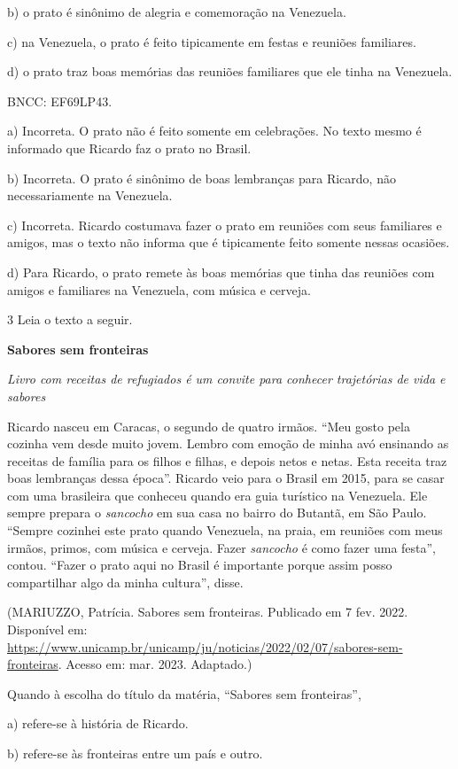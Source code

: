 b) o prato é sinônimo de alegria e comemoração na Venezuela.

c) na Venezuela, o prato é feito tipicamente em festas e reuniões
familiares.

d) o prato traz boas memórias das reuniões familiares que ele tinha na
Venezuela.

BNCC: EF69LP43.

a) Incorreta. O prato não é feito somente em celebrações. No texto mesmo
é informado que Ricardo faz o prato no Brasil.

b) Incorreta. O prato é sinônimo de boas lembranças para Ricardo, não
necessariamente na Venezuela.

c) Incorreta. Ricardo costumava fazer o prato em reuniões com seus
familiares e amigos, mas o texto não informa que é tipicamente feito
somente nessas ocasiões.

d) Para Ricardo, o prato remete às boas memórias que tinha das reuniões
com amigos e familiares na Venezuela, com música e cerveja.

\num{3} Leia o texto a seguir.

\textbf{Sabores sem fronteiras}

\emph{Livro com receitas de refugiados é um convite para conhecer
trajetórias de vida e sabores}

Ricardo nasceu em Caracas, o segundo de quatro irmãos. ``Meu gosto pela
cozinha vem desde muito jovem. Lembro com emoção de minha avó ensinando
as receitas de família para os filhos e filhas, e depois netos e netas.
Esta receita traz boas lembranças dessa época''. Ricardo veio para o
Brasil em 2015, para se casar com uma brasileira que conheceu quando era
guia turístico na Venezuela. Ele sempre prepara o \emph{sancocho} em sua
casa no bairro do Butantã, em São Paulo. ``Sempre cozinhei este prato
quando Venezuela, na praia, em reuniões com meus irmãos, primos, com
música e cerveja. Fazer \emph{sancocho} é como fazer uma festa'',
contou. ``Fazer o prato aqui no Brasil é importante porque assim posso
compartilhar algo da minha cultura'', disse.

(MARIUZZO, Patrícia. Sabores sem fronteiras. Publicado em 7 fev. 2022.
Disponível em:
\url{https://www.unicamp.br/unicamp/ju/noticias/2022/02/07/sabores-sem-fronteiras}.
Acesso em: mar. 2023. Adaptado.)

Quando à escolha do título da matéria, ``Sabores sem fronteiras'',

a) refere-se à história de Ricardo.

b) refere-se às fronteiras entre um país e outro.

